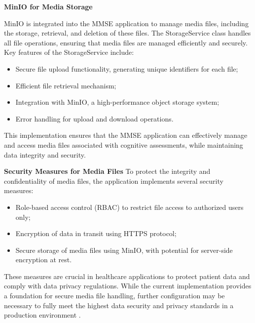 \textbf{MinIO for Media Storage}

MinIO is integrated into the MMSE application to manage media files, including the storage, retrieval, and deletion of these files. The StorageService class handles all file operations, ensuring that media files are managed efficiently and securely.
Key features of the StorageService include:
\begin{itemize}
\item Secure file upload functionality, generating unique identifiers for each file;
\item Efficient file retrieval mechanism;
\item Integration with MinIO, a high-performance object storage system;
\item Error handling for upload and download operations.
\end{itemize}
This implementation ensures that the MMSE application can effectively manage and access media files associated with cognitive assessments, while maintaining data integrity and security.

\textbf{Security Measures for Media Files}
To protect the integrity and confidentiality of media files, the application implements several security measures:
\begin{itemize}
\item Role-based access control (RBAC) to restrict file access to authorized users only;
\item Encryption of data in transit using HTTPS protocol;
\item Secure storage of media files using MinIO, with potential for server-side encryption at rest.
\end{itemize}
These measures are crucial in healthcare applications to protect patient data and comply with data privacy regulations. While the current implementation provides a foundation for secure media file handling, further configuration may be necessary to fully meet the highest data security and privacy standards in a production environment \cite{Krutz2017}.